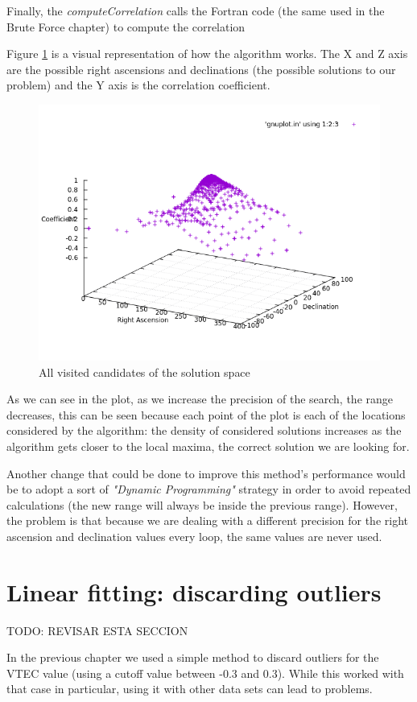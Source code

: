 Finally, the \textit{computeCorrelation} calls the Fortran code (the same used in the Brute Force chapter) to compute the correlation

Figure \ref{fig:consideredSolutions} is a visual representation of how the algorithm works. The X and Z axis are the possible right ascensions
and declinations (the possible solutions to our problem) and the Y axis is the correlation coefficient.

\begin{figure}[!htb]
	\begin{centering}
		\includegraphics[width=0.5\linewidth]{images/ch6/hillClimbing/resultsAll.png}
		\caption{All visited candidates of the solution space}
		\label{fig:consideredSolutions}
	\end{centering}
\end{figure}

As we can see in the plot, as we increase the precision of the search, the range decreases, this can be seen because each point
of the plot is each of the locations considered by the algorithm: the density of considered solutions increases as the algorithm gets closer to the local maxima, the correct solution we are looking for.

Another change that could be done to improve this method's performance would be to adopt a sort of \textit{"Dynamic Programming"} strategy in order to avoid repeated calculations (the new range will always be inside the previous range). However, the problem is that because we are dealing with a different precision for the right ascension and declination values every loop, the same values are never used.

\section{Linear fitting: discarding outliers}

TODO: REVISAR ESTA SECCION

In the previous chapter we used a simple method to discard outliers for the VTEC value (using a cutoff value between -0.3 and 0.3). While this worked with that case in particular, using it with other data sets can lead to problems.

